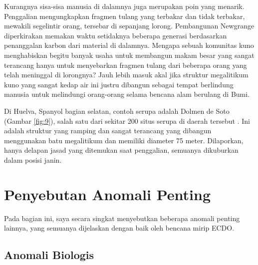 \documentclass[10pt,twocolumn,letterpaper]{article}
\begin{document}
Kurangnya sisa-sisa manusia di dalamnya juga merupakan poin yang menarik. Penggalian mengungkapkan fragmen tulang yang terbakar dan tidak terbakar, mewakili segelintir orang, tersebar di sepanjang lorong. Pembangunan Newgrange diperkirakan memakan waktu setidaknya beberapa generasi berdasarkan penanggalan karbon dari material di dalamnya. Mengapa sebuah komunitas kuno menghabiskan begitu banyak usaha untuk membangun makam besar yang sangat terancang hanya untuk menyebarkan fragmen tulang dari beberapa orang yang telah meninggal di lorongnya? Jauh lebih masuk akal jika struktur megalitikum kuno yang sangat kedap air ini justru dibangun sebagai tempat berlindung manusia untuk melindungi orang-orang selama bencana alam berulang di Bumi.

Di Huelva, Spanyol bagian selatan, contoh serupa adalah Dolmen de Soto (Gambar \ref{fig:9}), salah satu dari sekitar 200 situs serupa di daerah tersebut \cite{72,32}. Ini adalah struktur yang ramping dan sangat terancang yang dibangun menggunakan batu megalitikum dan memiliki diameter 75 meter. Dilaporkan, hanya delapan jasad yang ditemukan saat penggalian, semuanya dikuburkan dalam posisi janin.

\section{Penyebutan Anomali Penting}

Pada bagian ini, saya secara singkat menyebutkan beberapa anomali penting lainnya, yang semuanya dijelaskan dengan baik oleh bencana mirip ECDO.

\subsection{Anomali Biologis}
\end{document}
